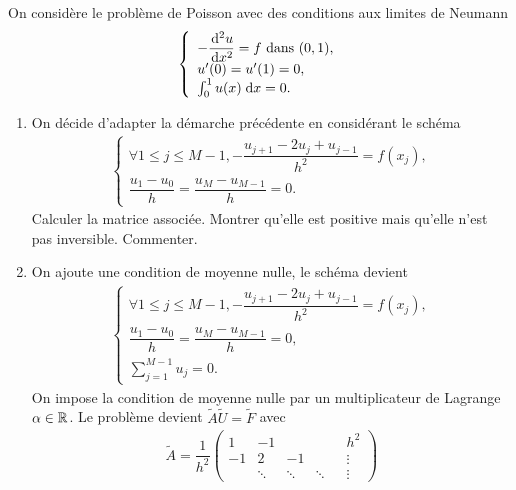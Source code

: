 \documentclass[12pt,a4paper,twoside]{article}
\begin{document}
\begin{exercise}
  On consid\`ere le probl\`eme de Poisson avec des conditions aux limites
  de Neumann 
  \begin{align*}
    \left\{
    \begin{array}{l}
      - \dfrac{\!\;\mathrm{d}^2 u}{\!\;\mathrm{d} x^2} = f \text{ dans } (0,1) ,
      \\
      u'(0) = u'(1) = 0 ,
      \\
      \int_0^1 u(x) \;\mathrm{d} x = 0 .
    \end{array}
  \right.
  \end{align*}
  \begin{enumerate}
  \item On d\'ecide d'adapter la d\'emarche pr\'ec\'edente en consid\'erant le sch\'ema
    \begin{align*}
      \left\{
      \begin{array}{l}
        \forall 1 \leq j \leq M-1 , - \dfrac{u_{j+1} - 2 u_j + u_{j-1}}{h^2} = f(x_j) ,
        \\
        \dfrac{u_1 - u_0}{h} = \dfrac{u_M - u_{M-1}}{h} = 0.
      \end{array}
      \right.
    \end{align*}
    Calculer la matrice associ\'ee. Montrer qu'elle est positive 
    mais qu'elle n'est pas inversible. Commenter.
  \item On ajoute une condition de moyenne nulle, le sch\'ema devient
    \begin{align*}
      \left\{
      \begin{array}{l}
        \forall 1 \leq j \leq M-1 , - \dfrac{u_{j+1} - 2 u_j + u_{j-1}}{h^2} = f(x_j) ,
        \\
        \dfrac{u_1 - u_0}{h} = \dfrac{u_M - u_{M-1}}{h} = 0 ,
        \\
        \sum\limits_{j=1}^{M-1} u_j = 0 .
      \end{array}
      \right.
    \end{align*}
    On impose la condition de moyenne nulle par un multiplicateur de Lagrange $\alpha \in \mathbb{R}$.
    Le probl\`eme devient $\widetilde{A} \widetilde{U} = \widetilde{F}$ avec
    \begin{align*}
      \widetilde{A} = \dfrac{1}{h^2}
      \begin{pmatrix}
        1 & -1 & & & & h^2
        \\
        -1 & 2 & -1& & & \vdots
        \\
        & \ddots & \ddots & \ddots & & \vdots

\end{pmatrix}
\end{align*}
\end{enumerate}
\end{exercise}
\end{document}
